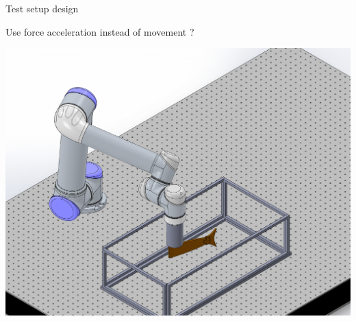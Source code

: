 \documentclass[aspectratio=169, xcolor=table]{beamer}
\begin{document}
\begin{frame}{Test setup design}
\begin{block}{Use force acceleration instead of movement \color{red} \huge ? \normalsize \color{black}}
\begin{center}
\includegraphics[scale=0.27]{Test_Bed.pdf}
\end{center}
\end{block}
\end{frame}
\end{document}
